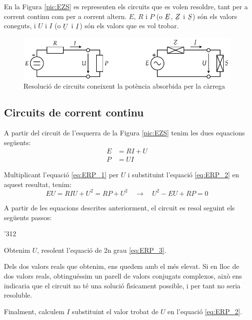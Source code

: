 En la Figura \vref{pic:EZS} es representen els circuits que es volen
resoldre, tant per a corrent continu com per a corrent altern. $E$,
$R$ i $P$ (o $\cmplx{E}$, $\cmplx{Z}$ i $\cmplx{S}$) s\'{o}n els valors
coneguts, i $U$ i $I$ (o $\cmplx{U}$ i $\cmplx{I}$) s\'{o}n els valors
que es vol trobar.
\begin{figure}[htb]
\vspace{3mm} \centering
   \includegraphics{Imatges/Cap-CalcBas-EZS.pdf}
\caption{Resoluci\'{o} de circuits coneixent la pot\`{e}ncia absorbida per la c\`{a}rrega} \label{pic:EZS}
\end{figure}

\subsection{Circuits de corrent continu}

A partir del circuit de l'esquerra de la Figura \vref{pic:EZS} tenim les dues equacions seg\"{u}ents:
\begin{align}
   E &= R I + U \label{eq:ERP_1} \\
   P &= U I     \label{eq:ERP_2}
\end{align}

Multiplicant l'equaci\'{o} \eqref{eq:ERP_1} per $U$ i substituint l'equaci\'{o} \eqref{eq:ERP_2} en aquest resultat, tenim:
\begin{equation}
   E U = R I U + U^2 = R P + U^2 \quad \rightarrow \quad U^2 - E U + R P = 0 \label{eq:ERP_3}
\end{equation}

A partir de les equacions descrites anteriorment, el circuit es resol seguint els seg\"{u}ents passos:
\begin{dingautolist}{'312}
   \item Obtenim $U$, resolent l'equaci\'{o} de 2n grau \eqref{eq:ERP_3}.
   \item Dels dos valors reals que obtenim, ens quedem amb el m\'{e}s elevat. Si en lloc de dos valors reals, obtingu\'{e}ssim
   un parell de valors conjugats complexos, aix\`{o} ens indicaria que el circuit no t\'{e} una soluci\'{o} f\'{\i}sicament possible, i per tant no seria resoluble.
   \item Finalment, calculem $I$ substituint el valor trobat de $U$ en l'equaci\'{o} \eqref{eq:ERP_2}.
\end{dingautolist}

